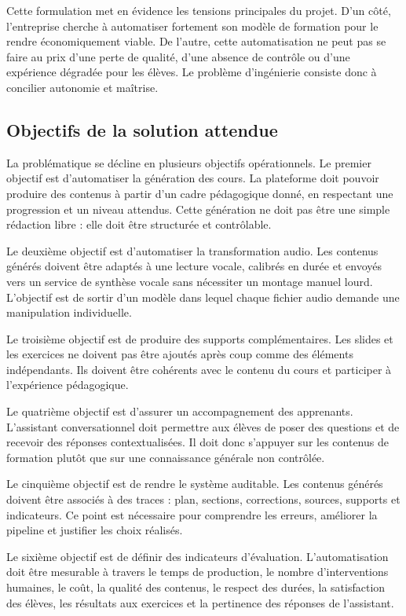 Cette formulation met en évidence les tensions principales du projet. D'un côté,
l'entreprise cherche à automatiser fortement son modèle de formation pour le rendre
économiquement viable. De l'autre, cette automatisation ne peut pas se faire au prix
d'une perte de qualité, d'une absence de contrôle ou d'une expérience dégradée pour les
élèves. Le problème d'ingénierie consiste donc à concilier autonomie et maîtrise.

\subsection{Objectifs de la solution attendue}

La problématique se décline en plusieurs objectifs opérationnels. Le premier objectif est
d'automatiser la génération des cours. La plateforme doit pouvoir produire des contenus
à partir d'un cadre pédagogique donné, en respectant une progression et un niveau
attendus. Cette génération ne doit pas être une simple rédaction libre : elle doit être
structurée et contrôlable.

Le deuxième objectif est d'automatiser la transformation audio. Les contenus générés
doivent être adaptés à une lecture vocale, calibrés en durée et envoyés vers un service de
synthèse vocale sans nécessiter un montage manuel lourd. L'objectif est de sortir d'un
modèle dans lequel chaque fichier audio demande une manipulation individuelle.

Le troisième objectif est de produire des supports complémentaires. Les slides et les
exercices ne doivent pas être ajoutés après coup comme des éléments indépendants. Ils
doivent être cohérents avec le contenu du cours et participer à l'expérience pédagogique.

Le quatrième objectif est d'assurer un accompagnement des apprenants. L'assistant
conversationnel doit permettre aux élèves de poser des questions et de recevoir des
réponses contextualisées. Il doit donc s'appuyer sur les contenus de formation plutôt que
sur une connaissance générale non contrôlée.

Le cinquième objectif est de rendre le système auditable. Les contenus générés doivent
être associés à des traces : plan, sections, corrections, sources, supports et indicateurs. Ce
point est nécessaire pour comprendre les erreurs, améliorer la pipeline et justifier les
choix réalisés.

Le sixième objectif est de définir des indicateurs d'évaluation. L'automatisation doit être
mesurable à travers le temps de production, le nombre d'interventions humaines, le coût,
la qualité des contenus, le respect des durées, la satisfaction des élèves, les résultats aux
exercices et la pertinence des réponses de l'assistant.

